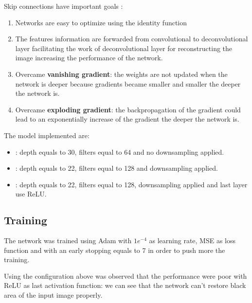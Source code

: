Skip connections have important goals \cite{resnet}:
\begin{enumerate}
    \item Networks are easy to optimize using the identity function
    \item The features information are forwarded from convolutional to deconvolutional layer facilitating the work of deconvolutional layer for reconstructing the image increasing the performance of the network.
    \item Overcame \textbf{vanishing gradient}: the weights are not updated when the network is deeper because gradients became smaller and smaller the deeper the network is.
    \item Overcame \textbf{exploding gradient}: the backpropagation of the gradient could lead to an exponentially increase of the gradient the deeper the network is.
\end{enumerate}


The model implemented are: 

\begin{itemize}
    \item \textbf{}: depth equals to 30, filters equal to 64 and no downsampling applied.
    \item \textbf{}: depth equals to 22, filters equal to 128 and downsampling applied.\item \textbf{}: depth equals to 22, filters equal to 128, downsampling applied and last layer use ReLU.
\end{itemize}

\subsection{Training}\label{caessctraining:training}
The network was trained using Adam\cite{adam} with $1e^{-4}$ as learning rate, MSE as loss function and with an early stopping equals to 7 in order to push more the training.

Using the configuration above was observed that the performance were poor with ReLU as last activation function: we can see that the network can't restore black area of the input image properly.

